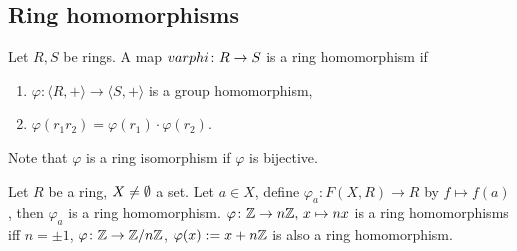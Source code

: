 \subsection{Ring homomorphisms}
\begin{definition}
    Let $R,S$ be rings. A map $\\varphi \colon R \to S$ is a ring homomorphism if 
    \begin{enumerate}
        \item $\varphi \colon \langle R,+ \rangle  \to \langle S,+ \rangle $ is a group homomorphism,
        \item $\varphi (r_1r_2)=\varphi (r_1)\cdot \varphi (r_2)$.
    \end{enumerate}
    Note that $\varphi $ is a ring isomorphism if $\varphi $ is bijective.
\end{definition}
\begin{example}
    Let $R$ be a ring, $X\neq \emptyset$ a set. Let $a\in X$, define $\varphi_a \colon F(X,R) \to R$ by $f\mapsto f(a)$, then $\varphi_a$ is a ring homomorphism. $\varphi \colon \mathbb{Z}\to n\mathbb{Z},\,x\mapsto nx$ is a ring homomorphisms iff $n=\pm 1$, $\varphi \colon \mathbb{Z} \to \mathbb{Z} /n\mathbb{Z}$, $\varphi (x):=x+n\mathbb{Z}$ is also a ring homomorphism.
\end{example}

